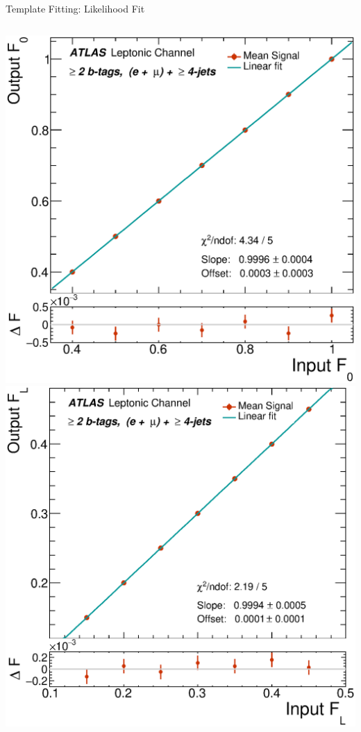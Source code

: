 \documentclass{beamer}
\begin{document}
{\begin{frame}[plain]{Template Fitting: Likelihood Fit}
{      \vspace{-11pt}
      \begin{columns}
      \includegraphics[width=1.15\textwidth]{../chapters/whel/figures/cali_curves_June-1-2017/Calicurve_F0_el_mu}
      \includegraphics[width=1.15\textwidth]{../chapters/whel/figures/cali_curves_June-1-2017/Calicurve_FL_el_mu}

\end{columns}}
\end{frame}}
\end{document}
